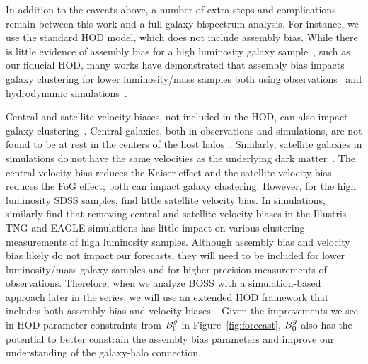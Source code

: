 In addition to the caveats above, a number of extra steps and complications remain
between this work and a full galaxy bispectrum analysis. For instance, we use
the standard \cite{zheng2007} HOD model,
which does not include assembly bias. While there is little evidence of
assembly bias for a high luminosity galaxy 
sample~\citep{zentner2016, vakili2019, beltz-mohrmann2020}, such as our 
fiducial HOD,
many works have demonstrated that assembly bias impacts galaxy
clustering for lower luminosity/mass samples both using
observations~\citep{pujol2014, hearin2016, pujol2017, zentner2019, vakili2019, obuljen2020}
and hydrodynamic simulations~\citep{chaves-montero2016, beltz-mohrmann2020}. 
 
Central and satellite velocity biases, not included in the
\cite{zheng2007} HOD, can also impact galaxy clustering~\citep{guo2015a,guo2015}. 
Central galaxies, both in observations and simulations, are not found to be 
at rest in the centers of the host 
halos~\citep[\eg][]{berlind2003, yoshikawa2003, vandenbosch2005, skibba2011}. 
Similarly, satellite galaxies in simulations do not have the same velocities as
the underlying dark matter~\citep[\eg][]{diemand2004, gao2004, lau2010,
munari2013, wu2013}. The central velocity bias reduces the Kaiser effect and
the satellite velocity bias reduces the FoG effect; both can impact
galaxy clustering. However, for the high luminosity SDSS samples,
\cite{guo2015} find little satellite velocity bias.
In simulations, \cite{beltz-mohrmann2020} similarly find that removing central and
satellite velocity biases in the Illustris-TNG and EAGLE simulations has
little impact on various clustering measurements of high luminosity
samples. Although assembly bias and velocity bias likely do not impact our 
forecasts, they will need to be included for lower luminosity/mass galaxy samples 
and for higher precision measurements of observations. Therefore, when 
we analyze BOSS with a simulation-based approach later in the series,
we will use an extended HOD framework that includes both assembly bias and velocity
biases~\citep[\eg][]{hearin2016, vakili2019, wibking2019, zhai2019,
salcedo2020, xu2020}. 
Given the improvements we see in HOD parameter constraints from $B^g_0$ in
Figure~\ref{fig:forecast}, $B^g_0$ also has the potential to better
constrain the assembly bias parameters and improve our understanding of the 
galaxy-halo connection. 

